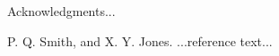 \documentclass{sigplanconf}
\begin{document}


\acks

Acknowledgments...





\begin{thebibliography}{}
\softraggedright

P. Q. Smith, and X. Y. Jones. ...reference text...

\end{thebibliography}
\end{document}
